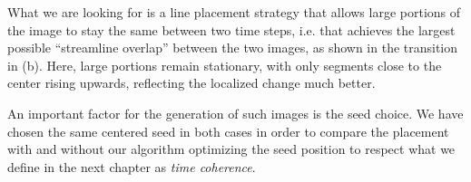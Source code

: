 What we are looking for is a line placement strategy that allows large portions of the image to 
stay the same between two time steps,
i.e. that achieves the largest possible ``streamline overlap'' between the two images, as shown
in the transition in  (b).
Here, large portions remain stationary, with only segments close to the center rising upwards,
reflecting the localized change much better.

An important factor for the generation of such images is the seed choice.
We have chosen the same centered seed in both cases in order to compare the
placement with and without our algorithm optimizing the seed position to respect
what we define in the next chapter as \textit{time coherence}.

\newpage








